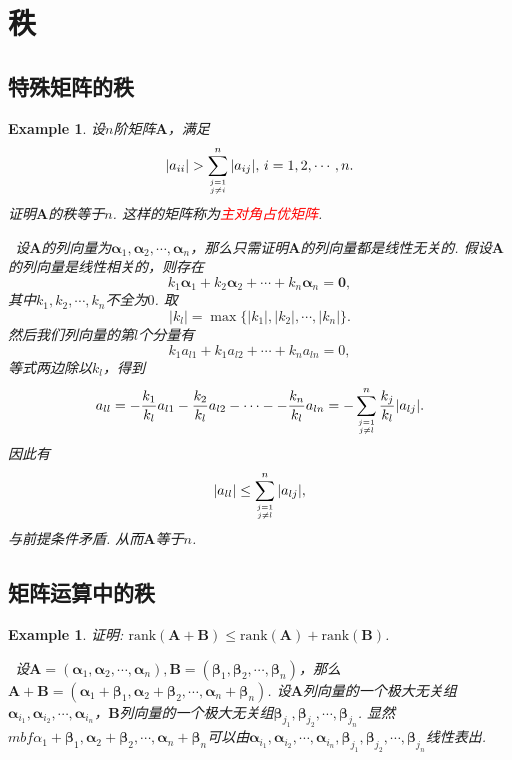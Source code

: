 \documentclass{article}
\newtheorem{example}[theorem]{Example}
\newcommand{\hints}{{\color{blue} \text{hints}}}
\newcommand{\mbf}[1]{\bm{#1}}
\newcommand{\rank}[1]{\text{rank}\left(#1\right)} %
\newcommand{\redt}[1]{\textcolor{red}{#1}}
\begin{document}
\newpage
\section{秩}

\subsection{特殊矩阵的秩}

\begin{example}
\rm 设$n$阶矩阵$\mbf{A}$，满足
$$
|a_{ii}| >  \sum\limits_{j = 1 \atop j \neq i}^{n} |a_{ij}|, \, i = 1,2,\cdots,n.
$$
证明$\mbf{A}$的秩等于$n$. 这样的矩阵称为\redt{主对角占优矩阵}. 

\hints\  设$\mbf{A}$的列向量为$\mbf{\alpha}_1,\mbf{\alpha}_2,\cdots,\mbf{\alpha}_n$，那么只需证明$\mbf{A}$的列向量都是线性无关的. 假设$\mbf{A}$的列向量是线性相关的，则存在
$$
k_1\mbf{\alpha}_1 + k_2\mbf{\alpha}_2 + \cdots + k_n\mbf{\alpha}_n = \mbf{0},
$$
其中$k_1,k_2,\cdots,k_n$不全为$0$. 取
$$
|k_l| = \max\{|k_1|,|k_2|,\cdots,|k_n|\}. 
$$
然后我们列向量的第$l$个分量有
$$
k_1a_{l1} + k_1a_{l2} + \cdots + k_na_{ln} = 0,
$$
等式两边除以$k_l$，得到
$$
a_{ll} = - \frac{k_1}{k_l}a_{l1} - \frac{k_2}{k_l}a_{l2} - \cdots - - \frac{k_n}{k_l}a_{ln} =  -\sum\limits_{j = 1 \atop j \neq l}^{n} \frac{k_j}{k_l}|a_{lj}|.
$$
因此有
$$
|a_{ll}| \leq \sum\limits_{j = 1 \atop j \neq l}^{n} |a_{lj}|,
$$
与前提条件矛盾. 从而$\mbf{A}$等于$n$. 
\end{example}

\subsection{矩阵运算中的秩}

\begin{example}
\rm 证明: $\rank{\mbf{A}+\mbf{B}} \leq \rank{\mbf{A}} + \rank{\mbf{B}}$.

\hints\ 设$\mbf{A} = (\mbf{\alpha}_1,\mbf{\alpha}_2,\cdots,\mbf{\alpha}_n),\mbf{B}=(\mbf{\beta}_1,\mbf{\beta}_2,\cdots,\mbf{\beta}_n)$，那么$\mbf{A}+\mbf{B} = (\mbf{\alpha}_1+\mbf{\beta}_1,\mbf{\alpha}_2+\mbf{\beta}_2,\cdots,\mbf{\alpha}_n+\mbf{\beta}_n)$. 设$\mbf{A}$列向量的一个极大无关组$\mbf{\alpha}_{i_1},\mbf{\alpha}_{i_2},\cdots,\mbf{\alpha}_{i_n}$，$\mbf{B}$列向量的一个极大无关组$\mbf{\beta}_{j_1},\mbf{\beta}_{j_2},\cdots,\mbf{\beta}_{j_n}$. 显然$mbf{\alpha}_1+\mbf{\beta}_1,\mbf{\alpha}_2+\mbf{\beta}_2,\cdots,\mbf{\alpha}_n+\mbf{\beta}_n$可以由$\mbf{\alpha}_{i_1},\mbf{\alpha}_{i_2},\cdots,\mbf{\alpha}_{i_n},\mbf{\beta}_{j_1},\mbf{\beta}_{j_2},\cdots,\mbf{\beta}_{j_n}$线性表出. 
\end{example}
\end{document}
